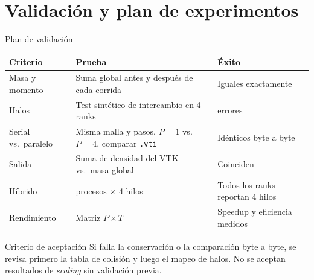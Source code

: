 \documentclass[aspectratio=169]{beamer}
\begin{document}
\section{Validación y plan de experimentos}

\begin{frame}{Plan de validación}
  \centering
  \scriptsize
  \begin{tabular}{>{\raggedright\arraybackslash}p{3.2cm}>{\raggedright\arraybackslash}p{5.0cm}>{\raggedright\arraybackslash}p{4.8cm}}
    \toprule
    Criterio & Prueba & Éxito \\
    \midrule
    Masa y momento & Suma global antes y después de cada corrida &
    Iguales exactamente \\
    Halos & Test sintético de intercambio en 4 ranks &
    0 errores \\
    Serial vs.\ paralelo & Misma malla y pasos, $P=1$ vs.\ $P=4$, comparar
    \texttt{.vti} & Idénticos byte a byte \\
    Salida & Suma de densidad del VTK vs.\ masa global &
    Coinciden \\
    Híbrido & 4 procesos $\times$ 4 hilos & Todos los ranks reportan 4 hilos \\
    Rendimiento & Matriz $P\times T$ & Speedup y eficiencia medidos \\
    \bottomrule
  \end{tabular}
  \vspace{3mm}
  \begin{block}{Criterio de aceptación}
    \footnotesize
    Si falla la conservación o la comparación byte a byte, se revisa primero
    la tabla de colisión y luego el mapeo de halos. No se aceptan resultados
    de \emph{scaling} sin validación previa.
  \end{block}
\end{frame}
\end{document}
